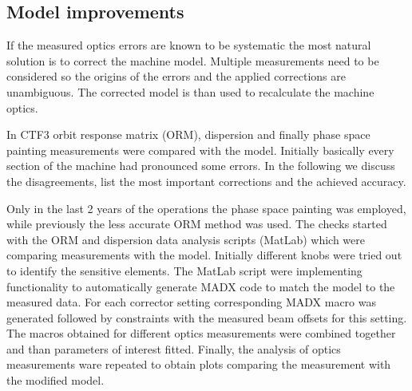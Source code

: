 \subsection{Model improvements \label{sec:03_ModelImprovs}}


If the measured optics errors are known to be systematic the most natural
solution is to correct the machine model.
Multiple measurements need to be considered so the origins of the errors and
the applied corrections are unambiguous. The corrected model is than used to
recalculate the machine optics.

In CTF3 orbit response matrix (ORM), dispersion and finally phase space painting
measurements were compared with the model. Initially basically every section of 
the machine had pronounced some errors. In the following we discuss the
disagreements, list the most important corrections and the achieved accuracy.

Only in the last 2 years of the operations the phase space painting 
was employed, while previously the less accurate ORM method was used. 
The checks started with the ORM and dispersion data analysis scripts (MatLab)
which were comparing measurements with the model.
Initially different knobs were tried out to identify the sensitive elements.
The MatLab script were implementing functionality to automatically generate
MADX code to match the model to the measured data. For each corrector setting
corresponding MADX macro was generated followed by constraints
with the measured beam offsets for this setting.
The macros obtained for different optics measurements were combined together
and than parameters of interest fitted. Finally, the analysis of optics measurements 
ware repeated to obtain plots comparing the measurement with the modified model.

